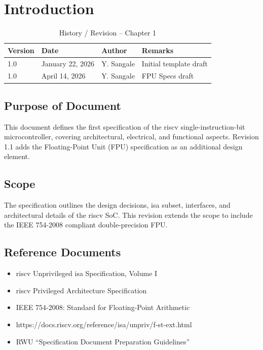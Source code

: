 
\chapter{Introduction}
\label{chap:introduction}

\begin{table}[H]
\caption{History / Revision – Chapter 1}
\label{tab:history-ch1}
\centering
\begin{tabular}{llll}
\toprule
Version & Date & Author & Remarks \\
\midrule
1.0 & January 22, 2026 & Y. Sangale & Initial template draft \\
\midrule
1.0 & April 14, 2026 & Y. Sangale & FPU Specs draft \\
\bottomrule
\end{tabular}
\end{table}

\section{Purpose of Document}
This document defines the first specification of the \gls{riscv} single-instruction-bit microcontroller, covering architectural, electrical, and functional aspects. Revision 1.1 adds the Floating-Point Unit (FPU) specification as an additional design element.

\section{Scope}
The specification outlines the design decisions, \gls{isa} subset, interfaces, and architectural details of the \gls{riscv} \gls{SoC}. This revision extends the scope to include the IEEE 754-2008 compliant double-precision FPU.


\section{Reference Documents}
\begin{itemize}
    \item \gls{riscv} Unprivileged \gls{isa} Specification, Volume I
    \item \gls{riscv} Privileged Architecture Specification
    \item IEEE 754-2008: Standard for Floating-Point Arithmetic
    \item https://docs.riscv.org/reference/isa/unpriv/f-st-ext.html
    \item RWU “Specification Document Preparation Guidelines”
\end{itemize}

